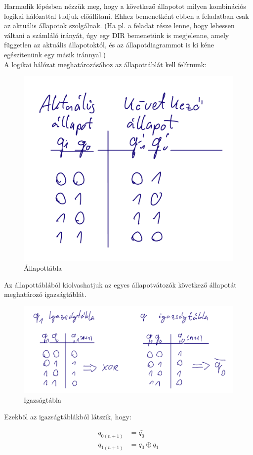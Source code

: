 Harmadik lépésben nézzük meg, hogy a következő állapotot milyen kombinációs logikai hálózattal tudjuk előállítani. Ehhez bemenetként ebben a feladatban csak az aktuális állapotok szolgálnak. (Ha pl. a feladat része lenne, hogy lehessen váltani a számláló irányát, úgy egy DIR bemenetünk is megjelenne, amely független az aktuális állapotoktól, és az állapotdiagrammot is ki kéne egészítenünk egy másik iránnyal.) \\

A logikai hálózat meghatározásához az állapottáblát kell felírnunk:

\begin{figure}[h!]
    \centering
    \includegraphics[width=0.5\linewidth]{31_allapottabla.png}
    \caption{Állapottábla}
    \label{fig:enter-label}
\end{figure}

Az állapottáblából kiolvashatjuk az egyes állapotvátozók következő állapotát meghatározó igazságtáblát.
\begin{figure}[h!]
        \centering
        \includegraphics[width=0.75\linewidth]{Figures//tmp/31_igazsagtabla.png}
        \caption{Igazságtábla}
        \label{fig:enter-label}
    \end{figure}
    
Ezekből az igazságtáblákból látszik, hogy:

\begin{equation}
\begin{aligned}{}
    q_{0(n+1)} &= \bar{q_0} \\
    q_{1(n+1)} &= q_0 \oplus q_1 \\
\end{aligned}
\end{equation}


